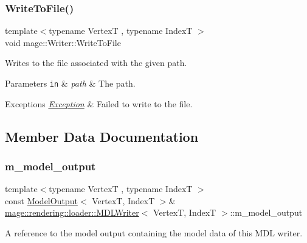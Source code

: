 \subsubsection{\texorpdfstring{Write\+To\+File()}{WriteToFile()}}
{\footnotesize\ttfamily template$<$typename VertexT , typename IndexT $>$ \\
void mage\+::\+Writer\+::\+Write\+To\+File}

Writes to the file associated with the given path.


\begin{DoxyParams}[1]{Parameters}
\mbox{\tt in}  & {\em path} & The path. \\
\hline
\end{DoxyParams}

\begin{DoxyExceptions}{Exceptions}
{\em \mbox{\hyperlink{classmage_1_1_exception}{Exception}}} & Failed to write to the file. \\
\hline
\end{DoxyExceptions}


\subsection{Member Data Documentation}
\mbox{\label{classmage_1_1rendering_1_1loader_1_1_m_d_l_writer_aefa6dfd7c4d7e2abe92e9c93b1e8638c}} 
\subsubsection{\texorpdfstring{m\+\_\+model\+\_\+output}{m\_model\_output}}
{\footnotesize\ttfamily template$<$typename VertexT , typename IndexT $>$ \\
const \mbox{\hyperlink{structmage_1_1rendering_1_1_model_output}{Model\+Output}}$<$ VertexT, IndexT $>$\& \mbox{\hyperlink{classmage_1_1rendering_1_1loader_1_1_m_d_l_writer}{mage\+::rendering\+::loader\+::\+M\+D\+L\+Writer}}$<$ VertexT, IndexT $>$\+::m\+\_\+model\+\_\+output\hspace{0.3cm}{\ttfamily [private]}}

A reference to the model output containing the model data of this M\+DL writer. 